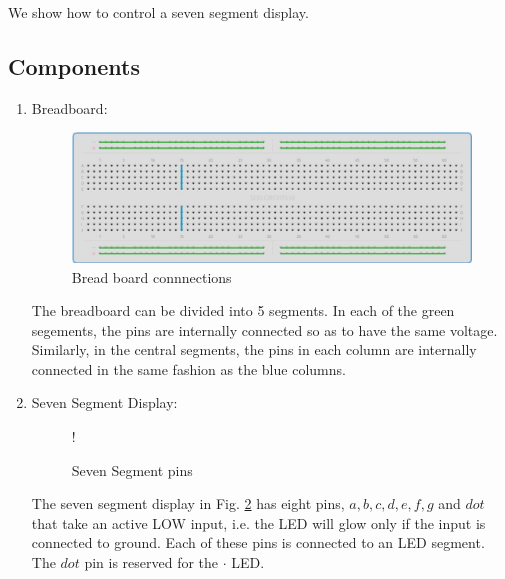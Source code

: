 We show how to control
a seven segment display.
\subsection{Components}
\begin{enumerate}[label=\arabic*.,ref=\theenumi]
\begin{table}[H]
	\centering

\caption{Components}
\label{table:components}
\end{table}
%
\item Breadboard:
\begin{figure}[H]
\begin{center}
\includegraphics[width=0.75\columnwidth]{ide/sevenseg/figs/breadboard}
\end{center}
\caption{Bread board connnections}
\label{fig:breadboard}
\end{figure}
%
The breadboard can be divided into 5 segments.  In each of the green segements, the pins are internally connected so as to have the same voltage.  Similarly, in the central segments, the pins in each column  are internally connected in the same fashion as the blue columns. 
\item Seven Segment Display:
\begin{figure}[!htb]
\begin{center}
 {!} {

}
\end{center}
\caption{Seven Segment pins}
\label{fig:sevenseg}
\end{figure}
%
The seven segment display in Fig. \ref{fig:sevenseg} has eight pins, $a, b, c, d, e, f, g$ and $dot$ that take an active LOW input, i.e.  the LED will glow only if the input is connected to ground.  Each of these pins is connected to an LED segment.  The $dot$ pin is  reserved for the $\cdot$ LED.  

\end{enumerate}
